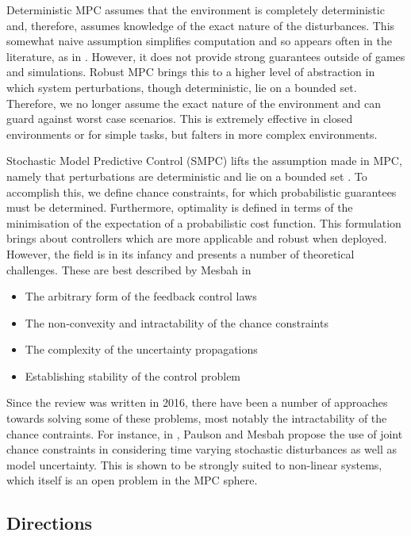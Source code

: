 \documentclass[preprint,11pt]{report}
\begin{document}
Deterministic MPC assumes that the environment is completely deterministic and, therefore, assumes
knowledge of the exact nature of the disturbances. This somewhat naive assumption simplifies
computation and so appears often in the literature, as in \cite{Rosolia2018}. However, it does not
provide strong guarantees outside of games and simulations. Robust MPC brings this to a higher level
of abstraction in which system perturbations, though deterministic, lie on a bounded set. Therefore,
we no longer assume the exact nature of the environment and can guard against worst case scenarios.
This is extremely effective in closed environments or for simple tasks, but falters in more complex
environments.

Stochastic Model Predictive Control (SMPC) lifts the assumption made in MPC, namely that
perturbations are deterministic and lie on a bounded set \cite{Mesbah2016}. To accomplish this, we
define chance constraints, for which probabilistic guarantees must be determined. Furthermore,
optimality is defined in terms of the minimisation of the expectation of a probabilistic
cost function. This formulation brings about controllers which are more applicable and robust when
deployed. However, the field is in its infancy and presents a number of theoretical challenges.
These are best described by Mesbah in \cite{Mesbah2016}

\begin{itemize}
	\item The arbitrary form of the feedback control laws
	\item The non-convexity and intractability of the chance constraints
	\item The complexity of the uncertainty propagations
	\item Establishing stability of the control problem
\end{itemize}

Since the review \cite{Mesbah2016} was written in 2016, there have been a number of approaches towards solving
some of
these problems, most notably the intractability of the chance contraints. For instance, in 
\cite{Paulson2019}, Paulson and Mesbah propose the use of joint chance constraints in considering
time varying stochastic disturbances as well as model uncertainty. This is shown to be strongly
suited to non-linear systems, which itself is an open problem in the MPC sphere.

\subsection{Directions}
\end{document}
